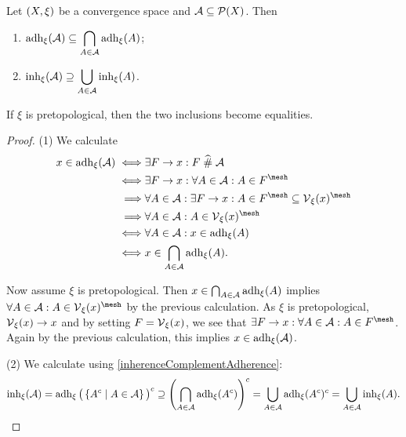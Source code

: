\begin{proposition}
Let $\left( X,\xi \right)$ be a convergence space and $\mathcal{A}\subseteq \operatorname{\mathcal{P}}(X)$. Then
\begin{enumerate}
\item $\displaystyle \operatorname{adh}_\xi(\mathcal{A}) \subseteq \bigcap_{A\in\mathcal{A}}\operatorname{adh}_\xi(A)$;
\item $\displaystyle \operatorname{inh}_\xi(\mathcal{A}) \supseteq \bigcup_{A\in\mathcal{A}}\operatorname{inh}_\xi(A)$.
\end{enumerate}
If $\xi$ is pretopological, then the two inclusions become equalities.
\end{proposition}
\begin{proof}
(1) We calculate
\begin{align*}
x\in\adh_\xi(\mathcal{A}) \iff& \exists F\to x: F\amesh \mathcal{A} \\
\iff& \exists F\to x: \forall A\in\mathcal{A}: A\in F^\mesh \\
\implies& \forall A\in\mathcal{A}: \exists F\to x: A\in F^\mesh \subseteq \vicinity_\xi(x)^\mesh \\
\implies& \forall A\in\mathcal{A}: A\in \vicinity_\xi(x)^\mesh \\
\iff& \forall A\in\mathcal{A}: x\in \adh_\xi(A) \\
\iff& x\in \bigcap_{A\in\mathcal{A}}\adh_\xi(A).
\end{align*}

Now assume $\xi$ is pretopological. Then $x\in \bigcap_{A\in\mathcal{A}}\operatorname{adh}_\xi(A)$ implies $\forall A\in\mathcal{A}: A\in \vicinity_\xi(x)^\mesh$ by the previous calculation. As $\xi$ is pretopological, $\operatorname{\mathcal{V}}_\xi(x) \to x$ and by setting $F = \operatorname{\mathcal{V}}_\xi(x)$, we see that $\exists F\to x: \forall A\in\mathcal{A}: A\in F^\mesh$. Again by the previous calculation, this implies $x\in \operatorname{adh}_\xi(\mathcal{A})$.

(2) We calculate using \ref{inherenceComplementAdherence}:
\[ \operatorname{inh}_\xi(\mathcal{A}) = \operatorname{adh}_\xi\big(\left\{ A^c \;\middle|\; A\in \mathcal{A} \right\}\big)^c \supseteq \left(\bigcap_{A\in\mathcal{A}}\operatorname{adh}_{\xi}(A^c)\right)^c = \bigcup_{A\in\mathcal{A}}\operatorname{adh}_{\xi}(A^c)^c = \bigcup_{A\in\mathcal{A}}\operatorname{inh}_{\xi}(A). \]
\end{proof}

